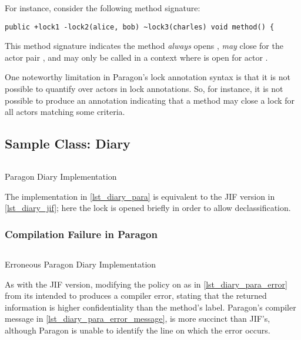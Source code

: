 For instance, consider the following method signature:

\begin{verbatim}
public +lock1 -lock2(alice, bob) ~lock3(charles) void method() {
\end{verbatim}

This method signature indicates the method \textit{always} opens , \textit{may} close  for the actor pair , and may only be called in a context where  is open for actor .

One noteworthy limitation in Paragon's lock annotation syntax is that it is not possible to quantify over actors in lock annotations. So, for instance, it is not possible to produce an annotation indicating that a method may close a lock for all actors matching some criteria.

\newpage

\subsection{Sample Class: Diary}

\begin{listing}[!ht]
	\inputminted{java}{content/code_sections/jif_para_bg/Diary.para}
	\caption{Paragon Diary Implementation}
	\label{lst_diary_para}
\end{listing}

The implementation in \autoref{lst_diary_para} is equivalent to the JIF version in \autoref{lst_diary_jif}; here the  lock is opened briefly in order to allow declassification.

\subsubsection{Compilation Failure in Paragon}

\begin{listing}[!ht]
	\inputminted{java}{content/code_sections/jif_para_bg/DiaryError.para}
	\caption{Erroneous Paragon Diary Implementation}
	\label{lst_diary_para_error}
\end{listing}

As with the JIF version, modifying the policy on  as in \autoref{lst_diary_para_error} from its intended  to  produces a compiler error, stating that the returned information is higher confidentiality than the method's label. Paragon's compiler message in \autoref{lst_diary_para_error_message}, is more succinct than JIF's, although Paragon is unable to identify the line on which the error occurs.


